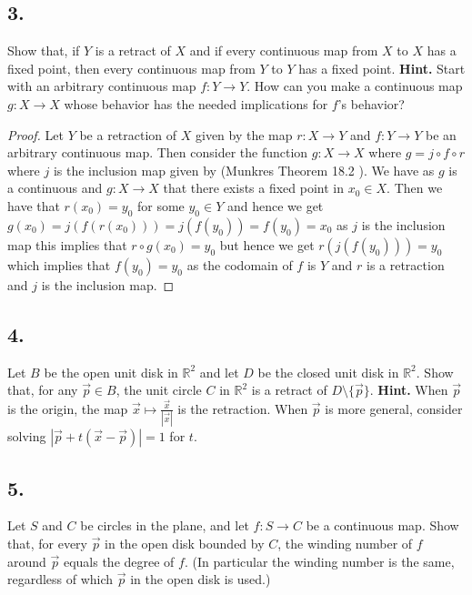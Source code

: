 \documentclass{amsart}
\theoremstyle{plain}
\theoremstyle{definition}
\theoremstyle{remark}
\begin{document}
\vspace{.15in}
\noindent
\subsection*{3.} Show that, if $Y$ is a retract of $X$ and if every continuous map from $X$ to $X$ has a fixed point, then every continuous map from $Y$ to $Y$ has a fixed point. {\bf Hint.} Start with an arbitrary continuous map $f : Y\to Y$. How can you make a continuous map $g : X\to X$ whose behavior has the needed implications for $f$'s behavior?

\begin{proof}
    Let $Y$ be a retraction of $X$ given by the map $r:X\to Y$ and $f:Y\to Y$ be an arbitrary continuous map. Then consider the function $g:X\to X$ where $g=j\circ f\circ r$ where $j$ is the inclusion map given by (Munkres Theorem 18.2 ). We have as $g$ is a continuous and $g:X \to X$ that there exists a fixed point in $x_0 \in X$. Then we have that $r(x_0)=y_0$ for some $y_0\in Y$ and hence we get $g(x_0)=j(f(r(x_0)))=j(f(y_0))=f(y_0)=x_0$ as $j$ is the inclusion map this implies that $r \circ g(x_0)=y_0$ but hence we get $r(j(f(y_0)))=y_0$ which implies that $f(y_0)=y_0$ as the codomain of $f$ is $Y$ and $r$ is a retraction and $j$ is the inclusion map.

    
\end{proof}
 


\vspace{.15in}
\noindent
\subsection*{4.} Let $B$ be the open unit disk in $\mathbb R ^2$ and let $D$ be the closed unit disk in $\mathbb R ^2$. Show that, for any $\vec{p} \in B$, the unit circle $C$ in $\mathbb R ^2$ is a retract of $D\setminus \{ \vec{p}\}$. {\bf Hint.} When $\vec{p}$ is the origin, the map $\vec{x} \mapsto \frac{\vec{x}}{|\vec{x}|}$ is the retraction. When $\vec{p}$ is more general, consider solving $|\vec{p} + t(\vec{x}-\vec{p})| = 1$ for $t$. 



\vspace{.15in}
\noindent
\subsection*{5.} Let $S$ and $C$ be circles in the plane, and let $f : S\to C$ be a continuous map. Show that, for every $\vec{p}$ in the open disk bounded by $C$, the winding number of $f$ around $\vec{p}$ equals the degree of $f$. (In particular the winding number is the same, regardless of which $\vec{p}$ in the open disk is used.) 
 
\end{document}
